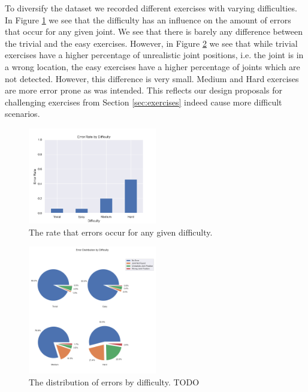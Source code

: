 To diversify the dataset we recorded different exercises with varying difficulties. In Figure \ref{fig:statistics_err_diff} we see that the difficulty has an influence on the amount of errors that occur for any given joint. We see that there is barely any difference between the trivial and the easy exercises. However, in Figure \ref{fig:statistics_err_dist_diff} we see that while trivial exercises have a higher percentage of unrealistic joint positions, i.e. the joint is in a wrong location, the easy exercises have a higher percentage of joints which are not detected. However, this difference is very small. Medium and Hard exercises are more error prone as was intended. This reflects our design proposals for challenging exercises from Section \ref{sec:exercises} indeed cause more difficult scenarios.

\begin{figure}
  \centering
  \includegraphics[width=0.5\textwidth]{figures/Data/Error_Rate_by_Difficulty.png}
  \caption[Error Rate by Difficulty]{The rate that errors occur for any given difficulty. }
  \label{fig:statistics_err_diff}
\end{figure}

\begin{figure}
  \centering
  \includegraphics[width=0.5\textwidth]{figures/Data/Error_Distribution_by_Difficulty.png}
  \caption[Error Distribution by Difficulty]{The distribution of errors by difficulty. TODO}
  \label{fig:statistics_err_dist_diff}
\end{figure}

